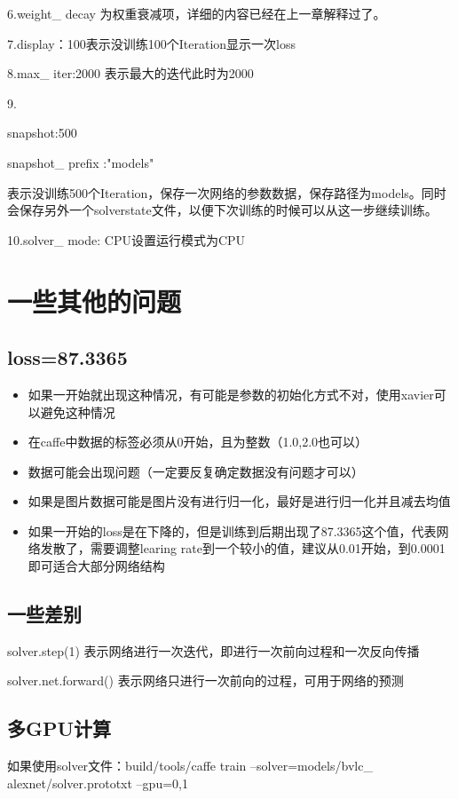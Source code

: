     6.weight\_ decay 为权重衰减项，详细的内容已经在上一章解释过了。
    
    7.display：100表示没训练100个Iteration显示一次loss
    
    8.max\_ iter:2000 表示最大的迭代此时为2000
    
    9.
    
    snapshot:500
    
    snapshot\_ prefix :"models" 
    
    表示没训练500个Iteration，保存一次网络的参数数据，保存路径为models。同时会保存另外一个solverstate文件，以便下次训练的时候可以从这一步继续训练。
    
    10.solver\_ mode: CPU设置运行模式为CPU




\section{一些其他的问题}
	\subsection{loss=87.3365}
		\begin{itemize}
			\item 如果一开始就出现这种情况，有可能是参数的初始化方式不对，使用xavier可以避免这种情况
			\item 在caffe中数据的标签必须从0开始，且为整数（1.0,2.0也可以）
			\item 数据可能会出现问题（一定要反复确定数据没有问题才可以）
			\item 如果是图片数据可能是图片没有进行归一化，最好是进行归一化并且减去均值
			\item 如果一开始的loss是在下降的，但是训练到后期出现了87.3365这个值，代表网络发散了，需要调整learing rate到一个较小的值，建议从0.01开始，到0.0001即可适合大部分网络结构
		\end{itemize}
		
	\subsection{一些差别}
		solver.step(1) 表示网络进行一次迭代，即进行一次前向过程和一次反向传播
		
		solver.net.forward() 表示网络只进行一次前向的过程，可用于网络的预测
		
	\subsection{多GPU计算}
		如果使用solver文件：build/tools/caffe train --solver=models/bvlc\_ alexnet/solver.prototxt --gpu=0,1
		
